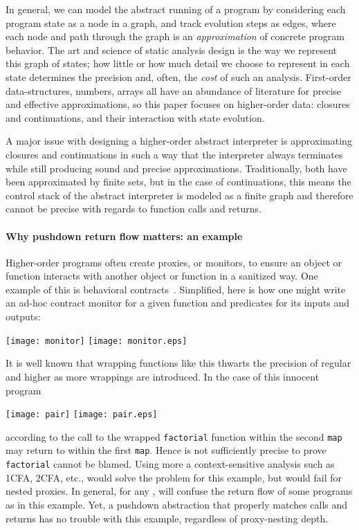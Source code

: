 In general, we can model the abstract running of a program by
considering each program state as a node in a graph, and track
evolution steps as edges, where each node and path through the graph
is an \emph{approximation} of concrete program behavior.
The art and science of static analysis design is the way we represent this graph of states; how little or how much detail we choose to represent in each state determines the precision and, often, the \emph{cost} of such an analysis.
First-order data-structures, numbers, arrays all have an abundance of
literature for precise and effective approximations, so this paper
focuses on higher-order data: closures and continuations, and their
interaction with state evolution.

A major issue with designing a higher-order abstract interpreter is
approximating closures and continuations in such a way that the
interpreter always terminates while still producing sound and precise
approximations.  Traditionally, both have been approximated by finite
sets, but in the case of continuations, this means the control stack
of the abstract interpreter is modeled as a finite graph and
therefore cannot be precise with regards to function calls and
returns.

\paragraph{Why pushdown return flow matters: an example}
Higher-order programs often create proxies, or monitors, to ensure an object or function interacts with another object or function in a sanitized way.
One example of this is behavioral contracts~\citep{dvanhorn:Findler2002Contracts}.
Simplified, here is how one might write an ad-hoc contract monitor for
a given function and predicates for its inputs and outputs:
\begin{center}
\ifpdf
  \texttt{[image: monitor]}
\else
  \texttt{[image: monitor.eps]}
\fi
 \end{center}

It is well known that wrapping functions like this thwarts the
precision of regular \zcfa{} and higher \kcfa{} as more wrappings are
introduced.
In the case of this innocent program
\begin{center}
\ifpdf
  \texttt{[image: pair]}
\else
  \texttt{[image: pair.eps]}
\fi
 \end{center}

according to \zcfa{} the call to the wrapped \texttt{factorial}
function within the second \texttt{map} may return to within the
first \texttt{map}.  Hence \zcfa{} is not sufficiently precise to 
prove \texttt{factorial} cannot be blamed.
Using more a context-sensitive analysis such as 1CFA, 2CFA, etc.,
would solve the problem for this example, but would fail for nested
proxies.
In general, for any , \kcfa{} will confuse the return flow of some
programs as in this example.
Yet, a pushdown abstraction that properly matches calls and returns
has no trouble with this example, regardless of proxy-nesting depth.

